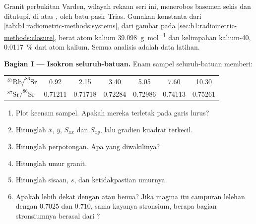 \begin{problem}
\label{pb:b1:radiometric-methods:1}
Granit perbukitan Varden, wilayah rekaan seri ini, menerobos basemen sekis dan ditutupi, di atas , oleh batu pasir Trias. Gunakan konstanta dari \cref{tab:b1:radiometric-methods:systems},  dari gambar pada \cref{sec:b1:radiometric-methods:closure}, berat atom kalium \qty{39.098}{g.mol^{-1}} dan kelimpahan kalium-40, \qty{0.0117}{\percent} dari atom kalium. Semua analisis adalah data latihan.

\medskip
\noindent\textbf{Bagian I --- Isokron seluruh-batuan.} Enam sampel seluruh-batuan memberi:
\begin{center}
\small
\begin{tabular}{|l|cccccc|}
\hline
$^{87}\mathrm{Rb}/^{86}\mathrm{Sr}$ & 0.92 & 2.15 & 3.40 & 5.05 & 7.60 & 10.30 \\
$^{87}\mathrm{Sr}/^{86}\mathrm{Sr}$ & 0.71211 & 0.71718 & 0.72284 & 0.72986 & 0.74113 & 0.75261 \\
\hline
\end{tabular}
\end{center}
\begin{enumerate}
  \item Plot keenam sampel. Apakah mereka terletak pada garis lurus?
  \item Hitunglah $\bar x$, $\bar y$, $S_{xx}$ dan $S_{xy}$, lalu gradien kuadrat terkecil.
  \item Hitunglah perpotongan. Apa yang diwakilinya?
  \item Hitunglah umur granit.
  \item Hitunglah sisaan, $s$, dan ketidakpastian umurnya.
  \item Apakah  lebih dekat dengan  atau  benua? Jika magma itu campuran lelehan dengan $0.7025$ dan $0.710$, sama kayanya stronsium, berapa bagian stronsiumnya berasal dari ?
\end{enumerate}


\end{problem}
